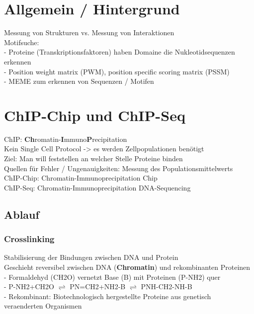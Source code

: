 \section{Allgemein / Hintergrund}
Messung von Strukturen vs. Messung von Interaktionen\\
Motifsuche:\\
- Proteine (Transkriptionsfaktoren) haben Domaine die Nukleotidsequenzen erkennen\\
- Position weight matrix (PWM), position specific scoring matrix (PSSM)\\
- MEME zum erkennen von Sequenzen / Motifen\\

\section{ChIP-Chip und ChIP-Seq}
ChIP: \textbf{Ch}romatin-\textbf{I}mmuno\textbf{P}recipitation\\
Kein Single Cell Protocol -> es werden Zellpopulationen benötigt\\
Ziel: Man will feststellen an welcher Stelle Proteine binden\\
Quellen für Fehler / Ungenauigkeiten: Messung des Populationsmittelwerts\\
ChIP-Chip: Chromatin-Immunoprecipitation Chip\\
ChIP-Seq: Chromatin-Immunoprecipitation DNA-Sequencing

\subsection{Ablauf}
\subsubsection{Crosslinking}
Stabilisierung der Bindungen zwischen DNA und Protein\\
Geschieht reversibel zwischen DNA (\textbf{Chromatin}) und rekombinanten Proteinen\\
\hspace*{10mm}- Formaldehyd (CH2O) vernetzt Base (B) mit Proteinen (P-NH2) quer\\
\hspace*{10mm}- P-NH2+CH2O $\rightleftharpoons$ PN=CH2+NH2-B $\rightleftharpoons$ PNH-CH2-NH-B\\
\hspace*{10mm}- Rekombinant: Biotechnologisch hergestellte Proteine aus genetisch\\
\hspace*{10mm}veraenderten Organismen\\

